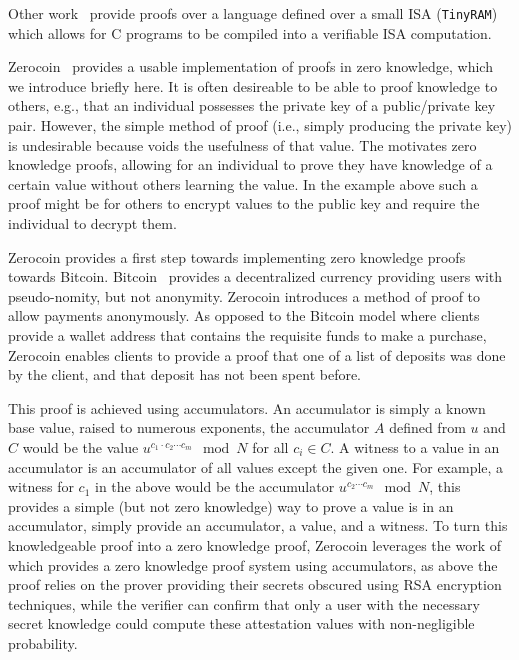 Other work~\cite{ben2013snarks} provide proofs over a language defined over a
small ISA (\texttt{TinyRAM}) which allows for C programs to be compiled into a
verifiable ISA computation.

Zerocoin~\cite{miers2013zerocoin} provides a usable implementation of proofs in
zero knowledge, which we introduce briefly here. It is often desireable to be
able to proof knowledge to others, e.g., that an individual possesses the
private key of a public/private key pair. However, the simple method of proof
(i.e., simply producing the private key) is undesirable because voids the
usefulness of that value. The motivates zero knowledge proofs, allowing for an
individual to prove they have knowledge of a certain value without others
learning the value. In the example above such a proof might be for others to
encrypt values to the public key and require the individual to decrypt them.

Zerocoin provides a first step towards implementing zero knowledge proofs
towards Bitcoin. Bitcoin~\cite{nakamoto2008bitcoin} provides a decentralized
currency providing users with pseudo-nomity, but not anonymity. Zerocoin
introduces a method of proof to allow payments anonymously. As opposed to the
Bitcoin model where clients provide a wallet address that contains the requisite
funds to make a purchase, Zerocoin enables clients to provide a proof that one
of a list of deposits was done by the client, and that deposit has not been
spent before.

This proof is achieved using accumulators. An accumulator is simply a known base
value, raised to numerous exponents, the accumulator $A$ defined from  $u$ and
$C$ would be the value $u^{c_1\cdot c_2\cdots c_m} \mod N$ for all $c_i\in C$. A
witness to a value in an accumulator is an accumulator of all values except the
given one. For example, a witness for $c_1$ in the above would be the
accumulator $u^{c_2\cdots c_m}\mod N$, this provides a simple (but not zero
knowledge) way to prove a value is in an accumulator, simply provide an
accumulator, a value, and a witness. To turn this knowledgeable proof into a
zero knowledge proof, Zerocoin leverages the work of \cite{camenisch2002dynamic}
which provides a zero knowledge proof system using accumulators, as above the
proof relies on the prover providing their secrets obscured using RSA encryption
techniques, while the verifier can confirm that only a user with the necessary
secret knowledge could compute these attestation values with non-negligible
probability.
